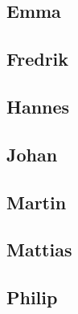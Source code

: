 \documentclass[a4paper]{article}
\begin{document}
  \subsection{Emma}
  \subsection{Fredrik}
  \subsection{Hannes}
  \subsection{Johan}
  \subsection{Martin}
  \subsection{Mattias}
  \subsection{Philip}
\end{document}
